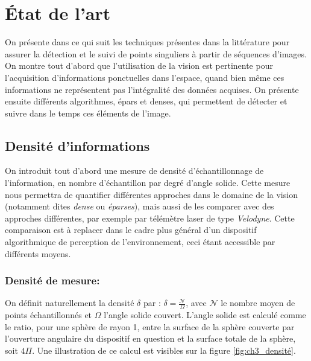 \section{État de l'art}
On présente dans ce qui suit les techniques présentes dans la littérature pour assurer la détection et le suivi de points singuliers à partir de séquences d'images. On montre tout d'abord que l'utilisation de la vision est pertinente pour l'acquisition d'informations ponctuelles dans l'espace, quand bien même ces informations ne représentent pas l'intégralité des données acquises. On présente ensuite différents algorithmes, épars et denses, qui permettent de détecter et suivre dans le temps ces éléments de l'image.


\subsection{Densité d'informations} \label{sec:ch3_densité_informations}
On introduit tout d'abord une mesure de densité d'échantillonnage de l'information, en nombre d'échantillon par degré d'angle solide. Cette mesure nous permettra de quantifier différentes approches dans le domaine de la vision (notamment dites \emph{dense} ou \emph{éparses}), mais aussi de les comparer avec des approches différentes, par exemple par télémètre laser de type \emph{Velodyne}. Cette comparaison est à replacer dans le cadre plus général d'un dispositif algorithmique de perception de l'environnement, ceci étant accessible par différents moyens.

\subsubsection{Densité de mesure:}
On définit naturellement la densité $\delta$ par : $\delta = \frac{\mathcal{N}}{\Omega}$, avec $\mathcal{N}$ le nombre moyen de points échantillonnés et $\Omega$ l'angle solide couvert. L'angle solide est calculé comme le ratio, pour une sphère de rayon 1, entre la surface de la sphère couverte par l'ouverture angulaire du dispositif en question et la surface totale de la sphère, soit $4\Pi$. Une illustration de ce calcul est visibles sur la figure \ref{fig:ch3_densité}.

